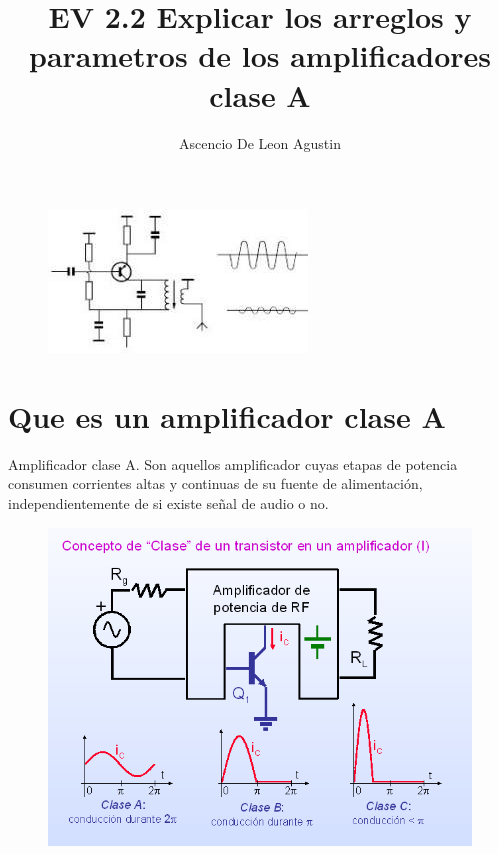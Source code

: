 \documentclass[10pt,letterpaper]{article}
\title{EV 2.2 Explicar los arreglos y parametros de los amplificadores clase A}
\author{Ascencio De Leon Agustin}
\begin{document}
\maketitle
\begin{figure}[h!]
\centering
\includegraphics[scale=.9]{260px-AmplificadorclaseA}
\end{figure}
\newpage
\section{Que es un amplificador clase A}
Amplificador clase A. Son aquellos amplificador cuyas etapas de potencia consumen corrientes altas y continuas de su fuente de alimentación, independientemente de si existe señal de audio o no.

\begin{figure}[h!]
\centering
\includegraphics[scale=.5]{img2}
\end{figure}
\newpage
\end{document}
